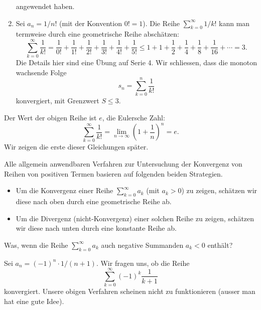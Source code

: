 \documentclass[../main.tex]{subfiles}
\begin{document}
\begin{enumerate}[(1)]
    angewendet haben.
  \item Sei $a_n = 1/n!$ (mit der Konvention $0! = 1$).
    Die Reihe $\sum_{k=0}^{\infty} 1/k!$ kann man
    termweise durch eine geometrische Reihe abschätzen:
    \[
      \sum_{k=0}^{\infty} \frac{1}{k!} = \frac{1}{0!}
      + \frac{1}{1!}
      + \frac{1}{2!}
      + \frac{1}{3!}
      + \frac{1}{4!}
      + \frac{1}{5!}
      \leq
      1 + 1 + \frac{1}{2} + \frac{1}{4} + \frac{1}{8}
      + \frac{1}{16} + \cdots = 3.
    \]
    Die Details hier sind eine Übung auf Serie 4.
    Wir schliessen, dass die monoton wachsende Folge
    \[
      s_n = \sum_{k=0}^{n} \frac{1}{k!}
    \]
    konvergiert, mit Grenzwert $S \leq 3$.
\end{enumerate}

\begin{remark}
  Der Wert der obigen Reihe ist $e$, die Eulersche Zahl:
  \[
    \sum_{k=0}^{\infty} \frac{1}{k!} = \lim_{n \to \infty}
    {\left( 1+ \frac{1}{n} \right)}^n = e.
  \]
  Wir zeigen die erste dieser Gleichungen später.
\end{remark}

\begin{summary}
  Alle allgemein anwendbaren Verfahren zur Untersuchung
  der Konvergenz von Reihen von positiven
  Termen basieren auf folgenden
  beiden Strategien.
  \begin{itemize}
    \item Um die Konvergenz einer Reihe
      $\sum_{k=0}^{\infty} a_k$ (mit $a_k > 0$) zu zeigen,
      schätzen wir diese nach oben durch
      eine geometrische Reihe ab.
    \item Um die Divergenz (nicht-Konvergenz) einer
      solchen Reihe zu zeigen, schätzen wir diese nach unten
      durch eine konstante Reihe ab.
  \end{itemize}
\end{summary}

\begin{question}
  Was, wenn die Reihe $\sum_{k=0}^{\infty} a_k$ auch
  negative Summanden $a_k < 0$ enthält?
\end{question}

\begin{example}
  Sei $a_n = {(-1)}^n \cdot 1/(n+1)$.
  Wir fragen uns, ob die Reihe
  \[
    \sum_{k=0}^{\infty} {(-1)}^k \frac{1}{k+1}
  \]
  konvergiert. Unsere obigen Verfahren scheinen 
  nicht zu funktionieren (ausser man hat eine
  gute Idee).
\end{example}
\end{document}
